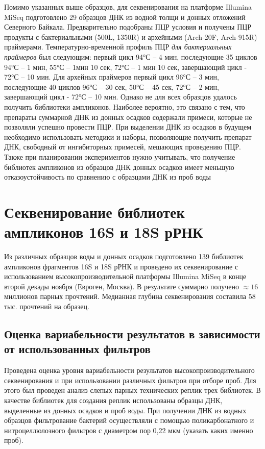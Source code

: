 \documentclass[a4paper,12pt,openany,final]{extreport}
\begin{document}
Помимо указанных выше образцов, для секвенирования на платформе Illumina
MiSeq подготовлено 29 образцов ДНК из водной толщи и донных отложений
Северного Байкала. Предварительно подобраны ПЦР условия и получены ПЦР
продукты с бактериальными (500L, 1350R) и архейными (Arch-20F,
Arch-915R) праймерами. Температурно-временной профиль ПЦР \emph{для
бактериальных праймеров} был следующим: первый цикл 94°С -- 4 мин,
последующие 35 циклов 94°С -- 1 мин, 55°С -- 1мин 10 сек, 72°С -- 1 мин
10 сек, завершающий цикл - 72°С -- 10 мин. Для {архейных праймеров}
первый цикл 96°С -- 3 мин, последующие 40 циклов 96°С -- 30 сек, 50°С --
45 сек, 72°С -- 2 мин, завершающий цикл - 72°С -- 10 мин.  Однако не для всех образцов удалось получить библиотеки ампликонов. Наиболее вероятно, это связано с тем, что препараты суммарной ДНК из донных осадков содержали примеси, которые не позволяли успешно провести ПЦР. При выделении ДНК из осадков в будущем необходимо использовать методики и наборы, позволяющие получить препарат ДНК, свободный от ингибиторных примесей, мешающих проведению ПЦР. Также при планировании экспериментов нужно учитывать, что получение библиотек ампликонов из образцов ДНК донных осадков имеет меньшую отказоустойчивость по сравнению с образцами ДНК из проб воды

\section{Секвенирование библиотек ампликонов 16S и 18S рРНК}

Из различных образцов воды и донных осадков подготовлено 139 библиотек
ампликонов фрагментов 16S и 18S рРНК и проведено их секвенирование с
использованием высокопроизводительной платформы Illumina MiSeq в конце
второй декады ноября (Евроген, Москва). В результате суммарно получено
\(\approx{}\!\!16\) миллионов парных прочтений. Медианная глубина
секвенирования составила 58 тыс. прочтений на образец.

\subsection{Оценка вариабельности результатов в зависимости от
использованных фильтров}

Проведена оценка уровня вариабельности результатов
высокопроизводительного секвенирования и при использовании различных
фильтров при отборе проб. Для этого был проведен анализ слепых парных
технических реплик трех библиотек. В качестве библиотек для создания
реплик использованы образцы ДНК, выделенные из донных осадков и проб
воды. При получении ДНК из водных образцов фильтрование бактерий
осуществляли с помощью поликарбонатного и нитроцеллюлозного фильтров с
диаметром пор 0,22 мкм (указать каких именно проб).
\end{document}
